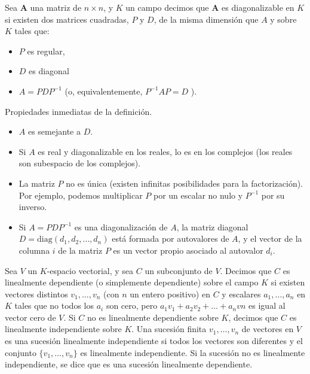 \begin{}
\begin{definition}
\end{definition}
\begin{definition}
Sea $\boldsymbol{A}$ una matriz de ${n \times n}$, y $K$  un campo  decimos que $\boldsymbol{A}$ es diagonalizable en $K$ si existen dos matrices cuadradas, $P$ y $D$, de la misma dimensión que $A$ y sobre $K$ tales que:\\
\begin{itemize}
 \item  $P$ es regular,
 \item  $D$ es diagonal 
 \item  $A=P D P^{-1}$
(o, equivalentemente, $P^{-1} A P=D$ ).
\end{itemize}
\end{definition}
Propiedades inmediatas de la definición.
\begin{itemize}
    \item $A$ es semejante a $D$.
    \item Si $A$ es real y diagonalizable en los reales, lo es en los complejos (los reales son subespacio de los complejos).
    \item La matriz $P$ no es única (existen infinitas posibilidades para la factorización). Por ejemplo, podemos multiplicar $P$ por un escalar no nulo y $P^{-1}$ por su inverso.
    \item Si $A = PDP^{-1}$ es una diagonalización de $A$, la matriz diagonal $D = \text{diag}(d_1, d_2, \dots, d_n)$ está formada por autovalores de $A$, y el vector de la columna $i$ de la matriz $P$ es un vector propio asociado al autovalor $d_i$.
\end{itemize}
\begin{definition}
Sea \( V \) un \( K \)-espacio vectorial, y sea \( C \) un subconjunto de \( V \). Decimos que \( C \) es linealmente dependiente (o simplemente dependiente) sobre el campo \( K \) si existen vectores distintos \( v_1, \ldots, v_n \) (con \( n \) un entero positivo) en \( C \) y escalares \( a_1, \ldots, a_n \) en \( K \) tales que no todos los \( a_i \) son cero, pero \( a_1v_1 + a_2v_2 + \ldots + a_nvn \) es igual al vector cero de \( V \). Si \( C \) no es linealmente dependiente sobre \( K \), decimos que \( C \) es linealmente independiente sobre \( K \). Una sucesión finita \( v_1, \ldots, v_n \) de vectores en \( V \) es una sucesión linealmente independiente si todos los vectores son diferentes y el conjunto \( \{v_1, \ldots, v_n\} \) es linealmente independiente. Si la sucesión no es linealmente independiente, se dice que es una sucesión linealmente dependiente.

\end{definition}
\end{}
